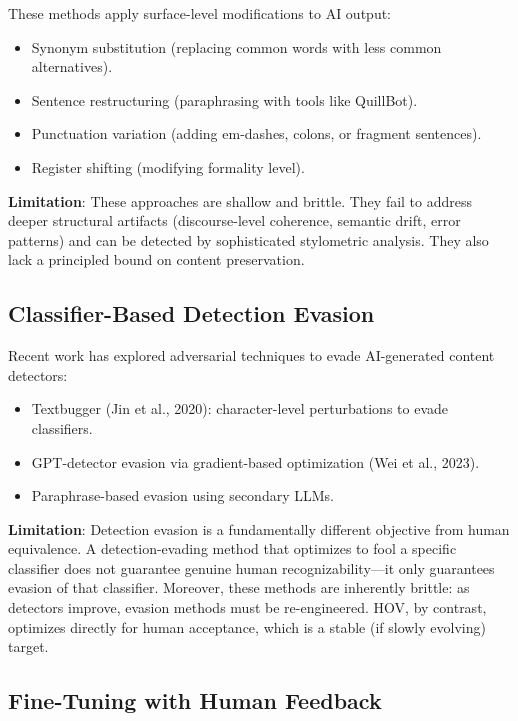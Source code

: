 \documentclass[12pt,oneside]{article}
\begin{document}
These methods apply surface-level modifications to AI output:
\begin{itemize}[noitemsep]
    \item Synonym substitution (replacing common words with less common alternatives).
    \item Sentence restructuring (paraphrasing with tools like QuillBot).
    \item Punctuation variation (adding em-dashes, colons, or fragment sentences).
    \item Register shifting (modifying formality level).
\end{itemize}

\textbf{Limitation}: These approaches are shallow and brittle. They fail to address deeper structural artifacts (discourse-level coherence, semantic drift, error patterns) and can be detected by sophisticated stylometric analysis. They also lack a principled bound on content preservation.

\subsection{Classifier-Based Detection Evasion}

Recent work has explored adversarial techniques to evade AI-generated content detectors:
\begin{itemize}[noitemsep]
    \item Textbugger (Jin et al., 2020): character-level perturbations to evade classifiers.
    \item GPT-detector evasion via gradient-based optimization (Wei et al., 2023).
    \item Paraphrase-based evasion using secondary LLMs.
\end{itemize}

\textbf{Limitation}: Detection evasion is a fundamentally different objective from human equivalence. A detection-evading method that optimizes to fool a specific classifier does not guarantee genuine human recognizability---it only guarantees evasion of that classifier. Moreover, these methods are inherently brittle: as detectors improve, evasion methods must be re-engineered. HOV, by contrast, optimizes directly for human acceptance, which is a stable (if slowly evolving) target.

\subsection{Fine-Tuning with Human Feedback}
\end{document}

